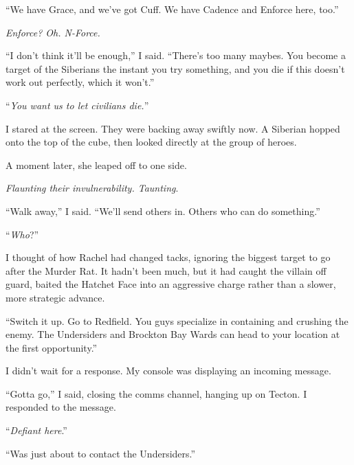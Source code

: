 ``We have Grace, and we've got Cuff.  We have Cadence and Enforce here, too.''



\emph{Enforce?  Oh.  N-Force.}



``I don't think it'll be enough,'' I said.  ``There's too many maybes.  You become a target of the Siberians the instant you try something, and you die if this doesn't work out perfectly, which it won't.''



``\emph{You want us to let civilians die.}''



I stared at the screen.  They were backing away swiftly now.  A Siberian hopped onto the top of the cube, then looked directly at the group of heroes.



A moment later, she leaped off to one side.



\emph{Flaunting their invulnerability.  Taunting}.



``Walk away,'' I said.  ``We'll send others in.  Others who can do something.''



``\emph{Who}?''



I thought of how Rachel had changed tacks, ignoring the biggest target to go after the Murder Rat.  It hadn't been much, but it had caught the villain off guard, baited the Hatchet Face into an aggressive charge rather than a slower, more strategic advance.



``Switch it up.  Go to Redfield.  You guys specialize in containing and crushing the enemy.  The Undersiders and Brockton Bay Wards can head to your location at the first opportunity.''



I didn't wait for a response.  My console was displaying an incoming message.



``Gotta go,'' I said, closing the comms channel, hanging up on Tecton.  I responded to the message.



``\emph{Defiant here}.''



``Was just about to contact the Undersiders.''



